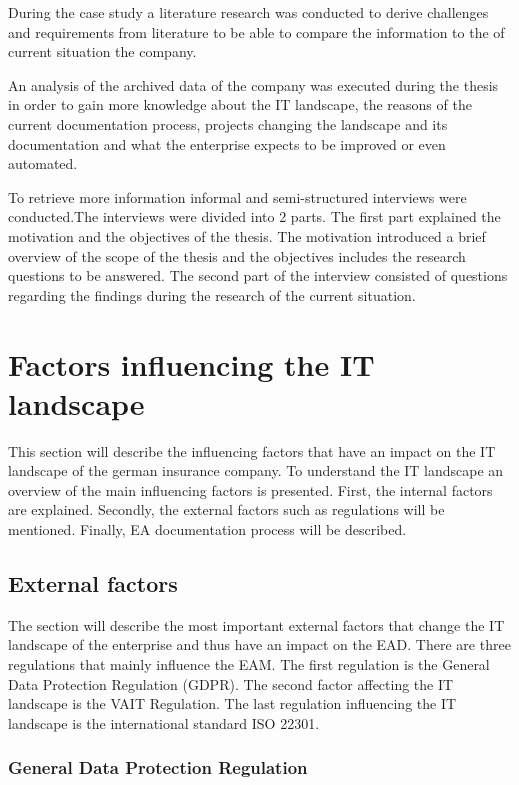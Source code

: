 During the case study a literature research was conducted to derive challenges and requirements from literature to be able to compare the information to the of current situation the company.

An analysis of the archived data of the company was executed during the thesis in order to gain more knowledge about the IT landscape, the reasons of the current documentation process, projects changing the landscape and its documentation and what the enterprise expects to be improved or even automated.

To retrieve more information informal and semi-structured interviews were conducted.The interviews were divided into 2 parts. The first part explained the motivation and the objectives of the thesis. The motivation introduced a brief overview of the scope of the thesis and the objectives includes the research questions to be answered. The second part of the interview consisted of questions regarding the findings during the research of the current situation.

\section{Factors influencing the IT landscape}\label{section:influencingfactors}

This section will describe the influencing factors that have an impact on the IT landscape of the german insurance company. To understand the IT landscape an overview of the main influencing factors is presented. First, the internal factors are explained. Secondly, the external factors such as regulations will be mentioned. Finally, EA documentation process will be described. 

\subsection{External factors}\label{subsection:externalinfluencingfactors}

The section will describe the most important external factors that change the IT landscape of the enterprise and thus have an impact on the EAD. There are three regulations that mainly influence the EAM. The first regulation is the General Data Protection Regulation (GDPR). The second factor affecting the IT landscape is the VAIT Regulation. The last regulation influencing the IT landscape is the international standard ISO 22301.

\subsubsection{General Data Protection Regulation}

